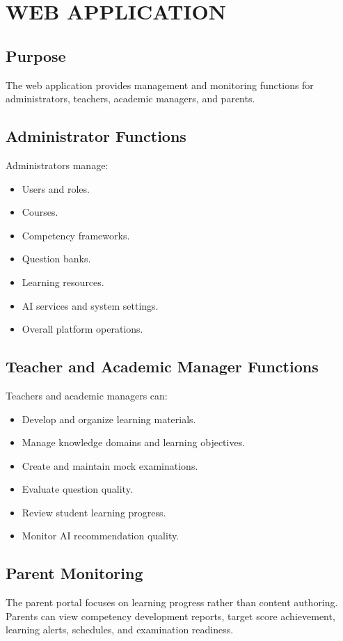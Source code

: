 \chapter{WEB APPLICATION}

\section{Purpose}

The web application provides management and monitoring functions for administrators, teachers, academic managers, and parents.

\section{Administrator Functions}

Administrators manage:

\begin{itemize}
    \item Users and roles.
    \item Courses.
    \item Competency frameworks.
    \item Question banks.
    \item Learning resources.
    \item AI services and system settings.
    \item Overall platform operations.
\end{itemize}

\section{Teacher and Academic Manager Functions}

Teachers and academic managers can:

\begin{itemize}
    \item Develop and organize learning materials.
    \item Manage knowledge domains and learning objectives.
    \item Create and maintain mock examinations.
    \item Evaluate question quality.
    \item Review student learning progress.
    \item Monitor AI recommendation quality.
\end{itemize}

\section{Parent Monitoring}

The parent portal focuses on learning progress rather than content authoring. Parents can view competency development reports, target score achievement, learning alerts, schedules, and examination readiness.


